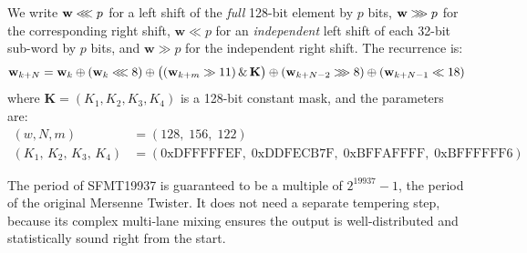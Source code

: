 \documentclass[preprint,1p,times]{elsarticle}
\begin{document}
We write $\mathbf{w} \lll p$ for a left shift of the \emph{full} 128-bit element by $p$ bits, $\mathbf{w} \ggg p$ for the corresponding right shift, $\mathbf{w} \ll p$ for an \emph{independent} left shift of each 32-bit sub-word by $p$ bits, and $\mathbf{w} \gg p$ for the independent right shift. The recurrence is:
\begin{equation}
\label{eq:sfmt_step}
\mathbf{w}_{k+N} = \mathbf{w}_k
    \oplus (\mathbf{w}_k \lll 8)
    \oplus \bigl((\mathbf{w}_{k+m} \gg 11)\, \&\, \mathbf{K}\bigr)
    \oplus (\mathbf{w}_{k+N-2} \ggg 8)
    \oplus (\mathbf{w}_{k+N-1} \ll 18)
\end{equation}
where $\mathbf{K}=(K_1, K_2, K_3, K_4)$ is a 128-bit constant mask, and the parameters are:
\begin{equation}
\label{eq:sfmt_params}
\begin{aligned}
(w, N, m) &= (128,\; 156,\; 122)\\
(K_1,\, K_2,\, K_3,\, K_4) &= (\text{0xDFFFFFEF},\; \text{0xDDFECB7F},\; \text{0xBFFAFFFF},\; \text{0xBFFFFFF6})
\end{aligned}
\end{equation}

The period of SFMT19937 is guaranteed to be a multiple of $2^{19937}-1$, the period of the original Mersenne Twister. It does not need a separate tempering step, because its complex multi-lane mixing ensures the output is well-distributed and statistically sound right from the start.
\end{document}
